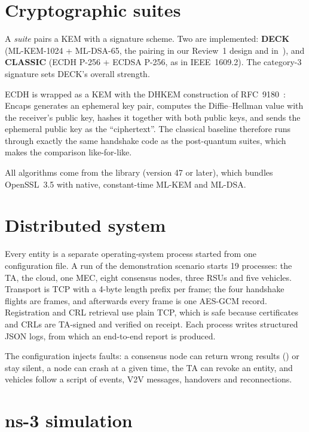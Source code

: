 \section{Cryptographic suites}

A \emph{suite} pairs a KEM with a signature scheme. Two are implemented:
\textbf{DECK} (ML-KEM-1024 + ML-DSA-65, the pairing in our Review~1 design and
in~\cite{olushola}), and \textbf{CLASSIC} (ECDH P-256 + ECDSA P-256, as in IEEE~1609.2).
The category-3 signature sets DECK's overall strength.

ECDH is wrapped as a KEM with the DHKEM construction of RFC~9180~\cite{hpke}:
\textsf{Encaps} generates an ephemeral key pair, computes the Diffie--Hellman
value with the receiver's public key, hashes it together with both public
keys, and sends the ephemeral public key as the ``ciphertext''. The classical
baseline therefore runs through exactly the same handshake code as the
post-quantum suites, which makes the comparison like-for-like.

All algorithms come from the  library (version 47 or
later), which bundles OpenSSL~3.5 with native, constant-time ML-KEM and
ML-DSA.

\section{Distributed system}

Every entity is a separate operating-system process started from one
configuration file. A run of the demonstration scenario starts 19 processes:
the TA, the cloud, one MEC, eight consensus nodes, three RSUs and five
vehicles. Transport is TCP with a 4-byte length prefix per frame; the four
handshake flights are frames, and afterwards every frame is one AES-GCM
record. Registration and CRL retrieval use plain TCP, which is safe because
certificates and CRLs are TA-signed and verified on receipt. Each process
writes structured JSON logs, from which an end-to-end report is produced.

The configuration injects faults: a consensus node can return wrong results
() or stay silent, a node can crash at a given time, the
TA can revoke an entity, and vehicles follow a script of events, V2V messages,
handovers and reconnections.

\section{ns-3 simulation}

